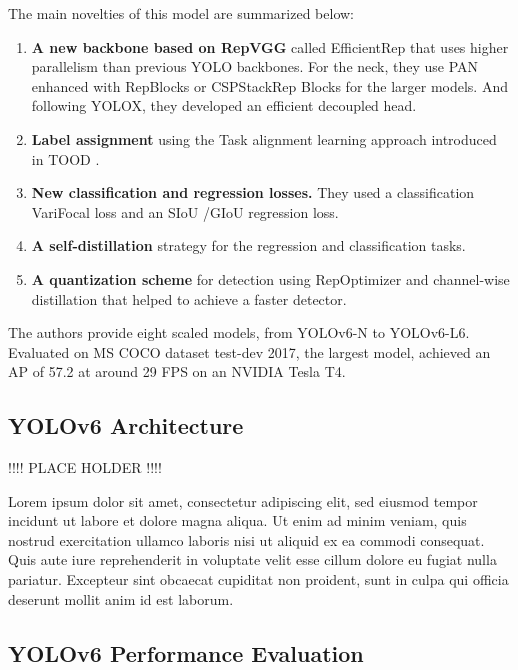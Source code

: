 \documentclass{article}
\begin{document}
The main novelties of this model are summarized below:

\begin{enumerate}
    \item \textbf{A new backbone based on RepVGG} \cite{ding2021repvgg} called EfficientRep that uses higher parallelism than previous YOLO backbones. For the neck, they use PAN \cite{liu2018path} enhanced with RepBlocks \cite{ding2021repvgg} or CSPStackRep \cite{wang2020cspnet} Blocks for the larger models. And following YOLOX, they developed an efficient decoupled head.
    \item \textbf{Label assignment} using the Task alignment learning approach introduced in TOOD \cite{feng2021tood}.
    \item \textbf{New classification and regression losses.} They used a classification VariFocal loss \cite{zhang2021varifocalnet} and an SIoU \cite{gevorgyan2022siou} /GIoU \cite{rezatofighi2019generalized} regression loss.
    \item \textbf{A self-distillation} strategy for the regression and classification tasks.
    \item \textbf{A quantization scheme} for detection using RepOptimizer \cite{ding2022re} and channel-wise distillation \cite{shu2021channel} that helped to achieve a faster detector.
\end{enumerate}


The authors provide eight scaled models, from YOLOv6-N to YOLOv6-L6. Evaluated on MS COCO dataset test-dev 2017, the largest model, achieved an AP of 57.2 at around 29 FPS on an NVIDIA Tesla T4.

\subsection{YOLOv6 Architecture}

!!!! PLACE HOLDER !!!!

Lorem ipsum dolor sit amet, consectetur adipiscing elit, sed eiusmod tempor incidunt ut labore et dolore magna aliqua. Ut enim ad minim veniam, quis nostrud exercitation ullamco laboris nisi ut aliquid ex ea commodi consequat. Quis aute iure reprehenderit in voluptate velit esse cillum dolore eu fugiat nulla pariatur. Excepteur sint obcaecat cupiditat non proident, sunt in culpa qui officia deserunt mollit anim id est laborum.

\subsection{YOLOv6 Performance Evaluation}
\end{document}
